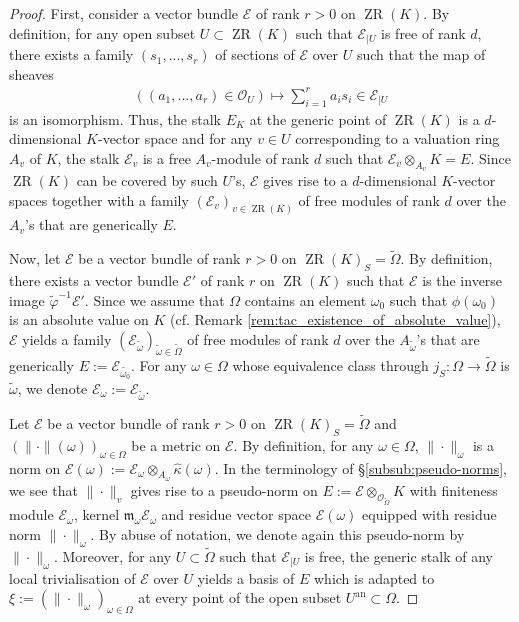 \documentclass [11pt,reqno]{amsart}
\newcommand{\1}{\mathmybb{1}}
\def\cE{{\mathcal{E}}}
\def\cO{{\mathcal{O}}}
\def\m{\mathfrak m}
\def\an{\operatorname{an}}
\def\ZR{\operatorname{ZR}}
\def\tilde{\widetilde}
\begin{document}
\begin{proof}
First, consider a vector bundle $\cE$ of rank $r>0$ on $\ZR(K)$. By definition, for any open subset $U\subset \ZR(K)$ such that $\cE_{|U}$ is free of rank $d$, there exists a family $(s_{1},...,s_{r})$ of sections of $\cE$ over $U$ such that the map of sheaves
\begin{align*}
\left((a_{1},...,a_{r})\in  \cO_{U}\right) \mapsto \displaystyle \sum_{i=1}^{r}a_{i}s_{i} \in \cE_{|U} 
\end{align*}
is an isomorphism. Thus, the stalk $E_{K}$ at the generic point of $\ZR(K)$ is a $d$-dimensional $K$-vector space and for any $v\in U$ corresponding to a valuation ring $A_{v}$ of $K$, the stalk $\cE_{v}$ is a free $A_{v}$-module of rank $d$ such that $\cE_{v}\otimes_{A_{v}}K = E$. Since $\ZR(K)$ can be covered by such $U$'s, $\cE$ gives rise to a $d$-dimensional $K$-vector spaces together with a family $(\cE_{v})_{v\in \ZR(K)}$ of free modules of rank $d$ over the $A_{v}$'s that are generically $E$. 

Now, let $\cE$ be a vector bundle of rank $r>0$ on $\ZR(K)_{S}=\tilde{\Omega}$. By definition, there exists a vector bundle $\cE'$ of rank $r$ on $\ZR(K)$ such that $\cE$ is the inverse image $\tilde{\varphi}^{-1}\cE'$. Since we assume that $\Omega$ contains an element $\omega_{0}$ such that $\phi(\omega_{0})$ is an absolute value on $K$ (cf. Remark \ref{rem:tac_existence_of_absolute_value}), $\cE$ yields a family $(\cE_{\tilde{\omega}})_{\tilde{\omega}\in \tilde{\Omega}}$ of free modules of rank $d$ over the $A_{\tilde{\omega}}$'s that are generically $E:=\cE_{\tilde{\omega_{0}}}$. For any $\omega\in \Omega$ whose equivalence class through $j_{S}:\Omega\to \tilde{\Omega}$ is $\tilde{\omega}$, we denote $\cE_{\omega}:=\cE_{\tilde{\omega}}$.

Let $\cE$ be a vector bundle of rank $r>0$ on $\ZR(K)_{S}=\tilde{\Omega}$ and $(\|\cdot\|(\omega))_{\omega\in \Omega}$ be a metric on $\cE$. By definition, for any $\omega\in\Omega$, $\|\cdot\|_{\omega}$ is a norm on $\cE(\omega):=\cE_{\omega}\otimes_{A_{\omega}}\widehat{\kappa}(\omega)$. In the terminology of \S \ref{subsub:pseudo-norms}, we see that $\|\cdot\|_{v}$ gives rise to a pseudo-norm on $E:=\cE\otimes_{\cO_{\tilde{\Omega}}}K$ with finiteness module $\cE_{\omega}$, kernel $\m_{\omega}\cE_{\omega}$ and residue vector space $\cE(\omega)$ equipped with residue norm $\|\cdot\|_{\omega}$. By abuse of notation, we denote again this pseudo-norm by $\|\cdot\|_{\omega}$. Moreover, for any $U\subset\tilde{\Omega}$ such that $\cE_{|U}$ is free, the generic stalk of any local trivialisation of $\cE$ over $U$ yields a basis of $E$ which is adapted to $\xi:=(\|\cdot\|_{\omega})_{\omega\in\Omega}$ at every point of the open subset $U^{\an}\subset \Omega$.


\end{proof}
\end{document}
